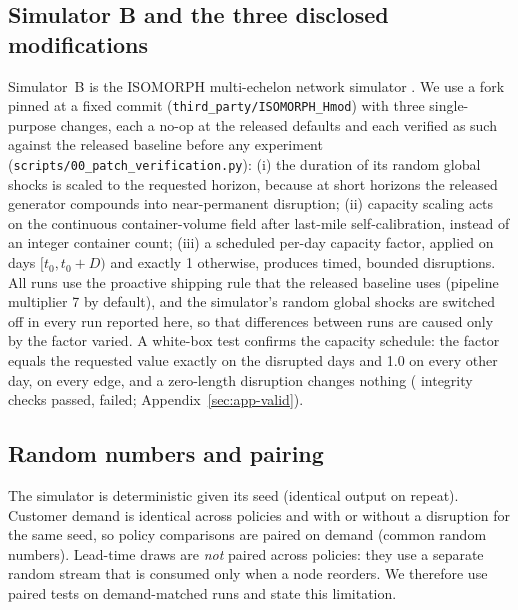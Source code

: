 \documentclass[11pt,a4paper]{article}
\begin{document}
\subsection{Simulator B and the three disclosed modifications}\label{sec:simB}
Simulator~B is the ISOMORPH multi-echelon network simulator \citep{zhang2026isomorph}. We use a fork pinned at a fixed commit (\texttt{third\_party/ISOMORPH\_Hmod}) with three single-purpose changes, each a no-op at the released defaults and each verified as such against the released baseline before any experiment (\texttt{scripts/00\_patch\_verification.py}): (i) the duration of its random global shocks is scaled to the requested horizon, because at short horizons the released generator compounds into near-permanent disruption; (ii) capacity scaling acts on the continuous container-volume field after last-mile self-calibration, instead of an integer container count; (iii) a scheduled per-day capacity factor, applied on days $[t_0, t_0+D)$ and exactly 1 otherwise, produces timed, bounded disruptions. All runs use the proactive shipping rule that the released baseline uses (pipeline multiplier 7 by default), and the simulator's random global shocks are switched off in every run reported here, so that differences between runs are caused only by the factor varied. A white-box test confirms the capacity schedule: the factor equals the requested value exactly on the disrupted days and 1.0 on every other day, on every edge, and a zero-length disruption changes nothing (\GateOnePass{} integrity checks passed, \GateOneFail{} failed; Appendix~\ref{sec:app-valid}).

\subsection{Random numbers and pairing}
The simulator is deterministic given its seed (identical output on repeat). Customer demand is identical across policies and with or without a disruption for the same seed, so policy comparisons are paired on demand (common random numbers). Lead-time draws are \emph{not} paired across policies: they use a separate random stream that is consumed only when a node reorders. We therefore use paired tests on demand-matched runs and state this limitation.
\end{document}
